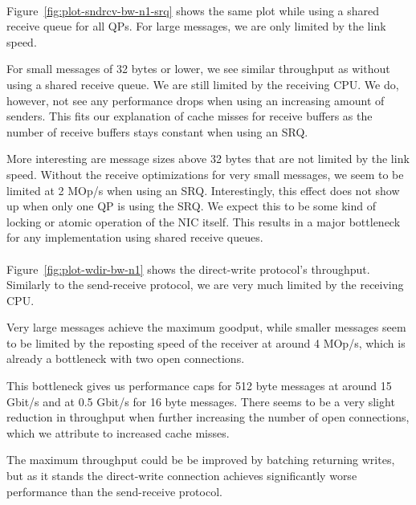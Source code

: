 \paragraph{} Figure~\ref{fig:plot-sndrcv-bw-n1-srq} shows the same plot while using a shared receive queue for all QPs. For
large messages, we are only limited by the link speed.

For small messages of 32 bytes or lower, we see similar throughput as without using a shared receive queue. We are still
limited by the receiving CPU. We do, however, not see any performance drops when using an increasing amount of senders. This
fits our explanation of cache misses for receive buffers as the number of receive buffers stays constant when using an SRQ.


More interesting are message sizes above 32 bytes that are not limited by the link speed. Without the receive optimizations 
for very small messages, we seem to be limited at 2 MOp/s
when using an SRQ. Interestingly, this effect does not show up when only
one QP is using the SRQ. We expect this to be some kind of locking or atomic operation of the NIC itself. This results in a
major bottleneck for any implementation using shared receive queues.

\paragraph{} Figure~\ref{fig:plot-wdir-bw-n1} shows the direct-write protocol's throughput. Similarly to the 
send-receive protocol, we are very much limited by the receiving CPU.

Very large messages achieve the maximum goodput,  while smaller messages seem to be limited by the reposting speed of the 
receiver at around 4 MOp/s, which is already a bottleneck with two open connections.

This bottleneck gives us performance caps for 512 byte messages at around 15 Gbit/s and at 0.5 Gbit/s for 16 byte messages.
There seems to be a very slight reduction in throughput when further increasing the number of open connections, which we 
attribute to increased cache misses.

The maximum throughput could be be improved by batching returning writes, but as it stands the direct-write connection
achieves significantly worse performance than the send-receive protocol.



